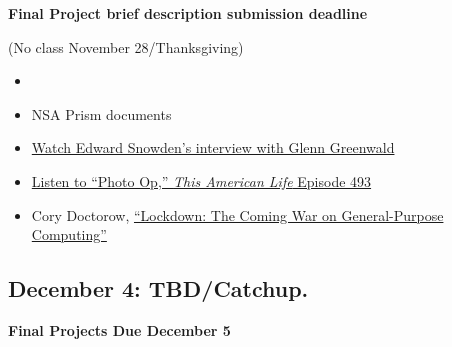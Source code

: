 \textbf{Final Project brief description submission deadline}

(No class November 28/Thanksgiving)

\begin{itemize}
\itemsep1pt\parskip0pt
\item
  \cite[Networked Authoritarianism]{mackinnon_consent_2012}
\item
  NSA Prism documents
\item
  \href{http://www.youtube.com/watch?v=5yB3n9fu-rM}{Watch Edward
  Snowden's interview with Glenn Greenwald}
\item
  \href{http://www.thisamericanlife.org/radio-archives/episode/493/picture-show?act=1}{Listen
  to ``Photo Op,'' \emph{This American Life} Episode 493}
\item
  Cory Doctorow,
  \href{http://boingboing.net/2012/01/10/lockdown.html}{``Lockdown: The
  Coming War on General-Purpose Computing''}
\end{itemize}

\subsection{December 4: TBD/Catchup.}

\textbf{Final Projects Due December 5}
